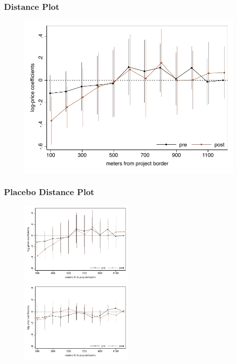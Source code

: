 \documentclass[aspectratio=149]{beamer}
\begin{document}
\begin{frame}
\frametitle{Distance Plot}
\begin{center}
\begin{figure}
\includegraphics[scale=0.72]{figures/distplot.pdf}
\vspace{-3mm}
\end{figure}
\end{center}
\end{frame}



\begin{frame}
\frametitle{Placebo Distance Plot}
\begin{center}
\begin{figure}


\includegraphics[width=0.5\textwidth,trim={.77cm 0cm .21cm 0cm}]{figures/distplot.pdf}
   \hfill
\includegraphics[width=0.5\textwidth,trim={.77cm 0cm .21cm 0cm},clip]{figures/distplot_placebo.pdf}

\end{figure}
\end{center}
\end{frame}
\end{document}
